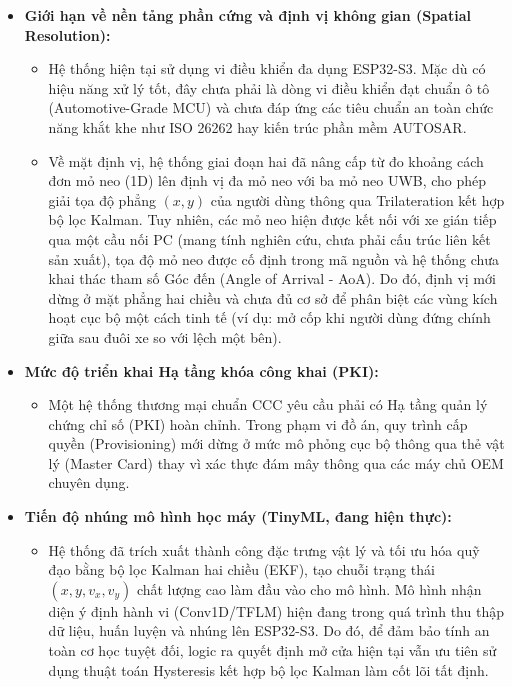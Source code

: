 \begin{itemize}
    \item \textbf{Giới hạn về nền tảng phần cứng và định vị không gian (Spatial Resolution):}
    \begin{itemize}
        \item Hệ thống hiện tại sử dụng vi điều khiển đa dụng ESP32-S3. Mặc dù có hiệu năng xử lý tốt, đây chưa phải là dòng vi điều khiển đạt chuẩn ô tô (Automotive-Grade MCU) và chưa đáp ứng các tiêu chuẩn an toàn chức năng khắt khe như ISO 26262 hay kiến trúc phần mềm AUTOSAR.
        \item Về mặt định vị, hệ thống giai đoạn hai đã nâng cấp từ đo khoảng cách đơn mỏ neo (1D) lên định vị đa mỏ neo với ba mỏ neo UWB, cho phép giải tọa độ phẳng $(x, y)$ của người dùng thông qua Trilateration kết hợp bộ lọc Kalman. Tuy nhiên, các mỏ neo hiện được kết nối với xe gián tiếp qua một cầu nối PC (mang tính nghiên cứu, chưa phải cấu trúc liên kết sản xuất), tọa độ mỏ neo được cố định trong mã nguồn và hệ thống chưa khai thác tham số Góc đến (Angle of Arrival - AoA). Do đó, định vị mới dừng ở mặt phẳng hai chiều và chưa đủ cơ sở để phân biệt các vùng kích hoạt cục bộ một cách tinh tế (ví dụ: mở cốp khi người dùng đứng chính giữa sau đuôi xe so với lệch một bên).
    \end{itemize}

    \item \textbf{Mức độ triển khai Hạ tầng khóa công khai (PKI):}
    \begin{itemize}
        \item Một hệ thống thương mại chuẩn CCC yêu cầu phải có Hạ tầng quản lý chứng chỉ số (PKI) hoàn chỉnh. Trong phạm vi đồ án, quy trình cấp quyền (Provisioning) mới dừng ở mức mô phỏng cục bộ thông qua thẻ vật lý (Master Card) thay vì xác thực đám mây thông qua các máy chủ OEM chuyên dụng.
    \end{itemize}

    \item \textbf{Tiến độ nhúng mô hình học máy (TinyML, đang hiện thực):}
    \begin{itemize}
        \item Hệ thống đã trích xuất thành công đặc trưng vật lý và tối ưu hóa quỹ đạo bằng bộ lọc Kalman hai chiều (EKF), tạo chuỗi trạng thái $(x, y, v_x, v_y)$ chất lượng cao làm đầu vào cho mô hình. Mô hình nhận diện ý định hành vi (Conv1D/TFLM) hiện đang trong quá trình thu thập dữ liệu, huấn luyện và nhúng lên ESP32-S3. Do đó, để đảm bảo tính an toàn cơ học tuyệt đối, logic ra quyết định mở cửa hiện tại vẫn ưu tiên sử dụng thuật toán Hysteresis kết hợp bộ lọc Kalman làm cốt lõi tất định.
    \end{itemize}


\end{itemize}
